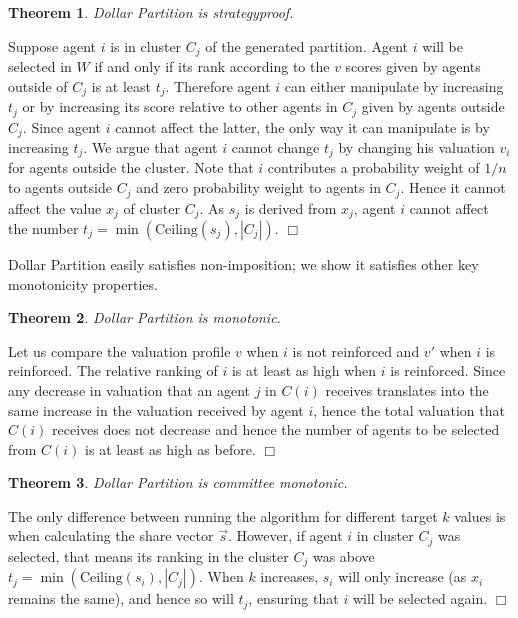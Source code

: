 \documentclass[letterpaper]{article}
\newtheorem{theorem}{Theorem}
\newcommand{\qed}{\unskip\hspace*{1em}\hspace{\fill}$\Box$}
\newenvironment{proof}[1][Proof]{\begin{trivlist}
\item[\hskip \labelsep {\it #1:}]}{%
\qed\end{trivlist}}
\begin{document}
\begin{theorem}
Dollar Partition is strategyproof.
\end{theorem}
\begin{proof}
Suppose agent $i$ is in cluster $C_j$ of the generated partition. Agent $i$ will be selected in $W$ if and only if its rank according to the $v$ scores given by agents outside of $C_j$ is at least $t_j$. Therefore agent $i$ can either manipulate by increasing $t_j$ or by increasing its score relative to other agents in $C_j$ given by agents outside $C_j$. Since agent $i$ cannot affect the latter, the only way it can manipulate is by increasing $t_j$.
We argue that agent $i$ cannot change $t_j$ by changing his valuation $v_i$ for agents outside the cluster. Note that $i$ contributes a probability weight of $1/n$ to agents outside $C_j$ and zero probability weight to agents in $C_j$. Hence it cannot affect the value $x_j$ of cluster $C_j$. As $s_j$ is derived from $x_j$, agent $i$ cannot affect the number $t_j= \min({\text{Ceiling}(s_j)},|C_j|)$.
\end{proof}

Dollar Partition easily satisfies non-imposition; we show it satisfies other
key monotonicity properties.





\begin{theorem}
Dollar Partition is monotonic.
\end{theorem}
\begin{proof}

Let us compare the valuation profile $v$ when $i$ is not reinforced and $v'$ when $i$ is reinforced.
The relative ranking of $i$ is at least as high when $i$ is reinforced. Since any decrease in valuation that an agent $j$ in $C(i)$ receives translates into the same increase in the valuation received by agent $i$, hence the total valuation that $C(i)$ receives does not decrease and hence the number of agents to be selected from $C(i)$ is at least as high as before.
\end{proof}

\begin{theorem}
Dollar Partition is committee monotonic.
\end{theorem}
\begin{proof}
The only difference between running the algorithm for different target $k$ values is when calculating the share vector $\vec{s}$. However, if agent $i$ in cluster $C_{j}$ was selected, that means its ranking in the cluster $C_{j}$ was above $t_{j}=\min(\text{Ceiling}(s_{i}),|C_{j}|)$. When $k$ increases, $s_{i}$ will only increase (as $x_{i}$ remains the same), and hence so will $t_{j}$, ensuring that $i$ will be selected again.%
\end{proof}
\end{document}
